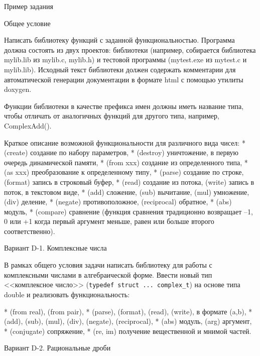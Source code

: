 
Пример задания

Общее условие

Написать библиотеку функций с заданной функциональностью. Программа должна
состоять из двух проектов: библиотеки (например, собирается библиотека
mylib.lib из mylib.c, mylib.h) и тестовой программы (mytest.exe из mytest.c и
mylib.lib). Исходный текст библиотеки должен содержать комментарии для
автоматической генерации документации в формате html с помощью утилиты
doxygen.

Функции библиотеки в качестве префикса имен должны иметь название типа, чтобы
отличать от аналогичных функций для другого типа, например, ComplexAdd().

Краткое описание возможной функциональности для различного вида чисел:
* (create) создание по набору параметров,
* (destroy) уничтожение, в первую очередь динамической памяти,
* (from xxx) создание из определенного типа,
* (as xxx) преобразование к определенному типу,
* (parse) создание по строке, (format) запись в строковый буфер,
* (read) создание из потока, (write) запись в поток, в текстовом виде,
* (add) сложение, (sub) вычитание, (mul) умножение, (div) деление,
* (negate) противоположное, (reciprocal) обратное,
* (abs) модуль,
* (compare) сравнение (функция сравнения традиционно возвращает –1, 0 или +1 когда первый аргумент меньше, равен или больше второго соответственно).


Вариант D-1. Комплексные числа

В рамках общего условия задачи написать библиотеку для работы с комплексными
числами в алгебраической форме. Ввести новый тип <<комплексное число>>
(\verb|typedef struct ... complex_t|) на основе типа double и реализовать функциональность:

* (from real), (from pair),
* (parse), (format), (read), (write), в формате (a,b),
* (add), (sub), (mul), (div), (negate), (reciprocal),
* (abs) модуль, (arg) аргумент,
* (conjugate) сопряжение,
* (re, im) получение вещественной и мнимой частей.


Вариант D-2. Рациональные дроби

